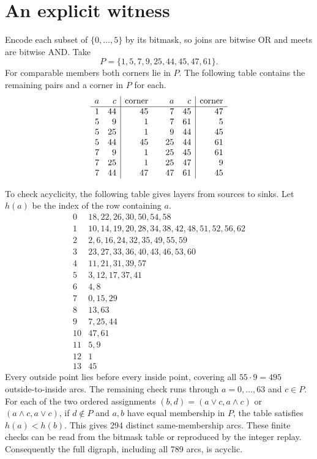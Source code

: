 \documentclass[11pt,a4paper]{amsart}
\begin{document}
\section{An explicit witness}

Encode each subset of $\{0,\ldots,5\}$ by its bitmask, so joins
are bitwise OR and meets are bitwise AND. Take
\[
 P=\{1,5,7,9,25,44,45,47,61\}.
\]
For comparable members both corners lie in $P$. The following table
contains the remaining pairs and a corner in $P$ for each.
\[
\begin{array}{rr|r@{\qquad}rr|r}
 a&c&\text{corner}&a&c&\text{corner}\\ \hline
 1&44&45&7&45&47\\
 5&9&1&7&61&5\\
 5&25&1&9&44&45\\
 5&44&45&25&44&61\\
 7&9&1&25&45&61\\
 7&25&1&25&47&9\\
 7&44&47&47&61&45
\end{array}
\]

To check acyclicity, the following table gives layers from sources
to sinks. Let $h(a)$ be the index of the row containing $a$.
\[
\begin{array}{r|l}
 0&18,22,26,30,50,54,58\\
 1&10,14,19,20,28,34,38,42,48,51,52,56,62\\
 2&2,6,16,24,32,35,49,55,59\\
 3&23,27,33,36,40,43,46,53,60\\
 4&11,21,31,39,57\\
 5&3,12,17,37,41\\
 6&4,8\\
 7&0,15,29\\
 8&13,63\\
 9&7,25,44\\
 10&47,61\\
 11&5,9\\
 12&1\\
 13&45
\end{array}
\]
Every outside point lies before every inside point, covering all
$55\cdot9=495$ outside-to-inside arcs. The remaining check runs
through $a=0,\ldots,63$ and $c\in P$. For each of the two ordered
assignments $(b,d)=(a\vee c,a\wedge c)$ or $(a\wedge c,a\vee c)$,
if $d\notin P$ and $a,b$ have equal membership in $P$, the table
satisfies $h(a)<h(b)$. This gives 294 distinct same-membership arcs.
These finite checks can be read from the bitmask table or reproduced
by the integer replay. Consequently the full digraph, including all 789
arcs, is acyclic.
\end{document}
